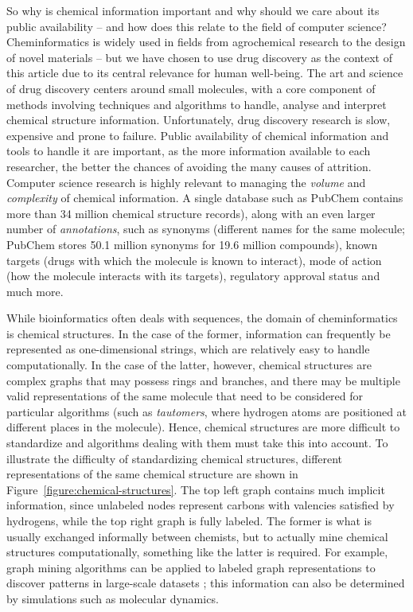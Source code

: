 \documentclass{sig-alternate}
\begin{document}
So why is chemical information important and why should we care about
its public availability -- and how does this relate to the field of
computer science? Cheminformatics is widely used in fields
from agrochemical research to the design of
novel materials -- but we have chosen to use drug discovery as the context
of this article due to its central relevance for human well-being.
The art and science of drug discovery centers around small
molecules, with a core component of methods involving
techniques and algorithms to handle, analyse and interpret
chemical structure information.
Unfortunately, drug discovery research is slow, expensive and prone to failure.
Public availability of chemical information and
tools to handle it are important, as the more information available to each
researcher, the better the chances of avoiding the many causes of attrition.
Computer science research is highly relevant to managing the \textit{volume}
and \textit{complexity} of chemical information.
A single database such as PubChem contains more than 34 million
chemical structure records), along with an even larger number of
\emph{annotations}, such as synonyms (different names for the same molecule;
PubChem stores 50.1 million synonyms for 19.6 million compounds),
known targets (drugs with which the molecule is known to interact),
mode of action (how the molecule interacts with its targets),
regulatory approval status and much more.

While bioinformatics often deals with sequences, the
domain of cheminformatics is chemical structures.
In the case of the former, information can frequently be represented as
one-dimensional strings, which are relatively easy to handle
computationally. In the case of the latter, however, chemical
structures are complex graphs that may possess rings and branches,
and there may be multiple valid representations of the same molecule
that need to be considered for particular algorithms
(such as \emph{tautomers}, where hydrogen atoms are positioned at
different places in the molecule). Hence, chemical
structures are more difficult to standardize and
algorithms dealing with them must take this into account.
To illustrate the difficulty of standardizing chemical structures,
different representations of the same chemical structure are shown in
Figure~\ref{figure:chemical-structures}. The top left graph contains
much implicit information, since unlabeled nodes represent carbons
with valencies satisfied by hydrogens, while the top right graph is
fully labeled. The former is what is
usually exchanged informally between chemists, but to actually mine
chemical structures computationally, something like the latter is
required.  For example, graph mining algorithms can be applied to
labeled graph representations to discover patterns in large-scale
datasets \cite{horst2009}; this information can also be determined
by simulations such as molecular dynamics.
\end{document}
